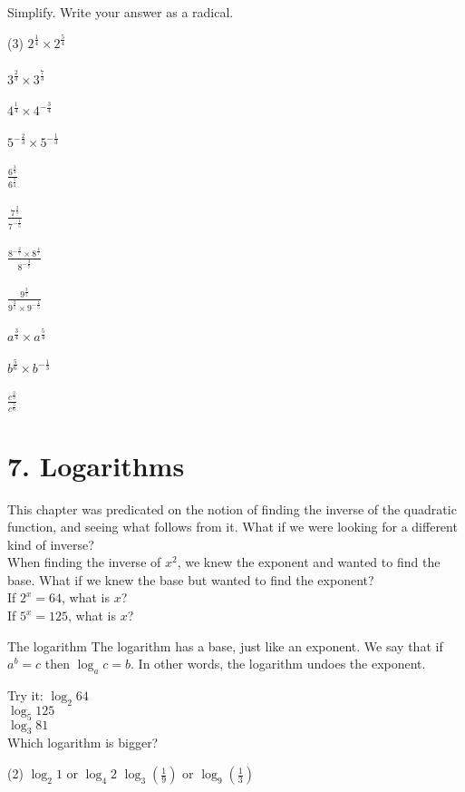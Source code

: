 \documentclass[12pt,fleqn]{book}
\newcommand{\prb}[1]{\begin{Exercise}#1\end{Exercise}}
\begin{document}
    \prb{Simplify. Write your answer as a radical.\\
        \begin{tasks}(3)
\task $\displaystyle 2^{\frac{1}{4}} \times 2^{\frac{5}{4}}$\\
\\[1in]
\task $\displaystyle 3^{\frac{2}{3}} \times 3^{\frac{7}{3}}$\\
\\[1in]
\task $\displaystyle 4^{\frac{1}{4}} \times 4^{-\frac{3}{4}}$\\
\\[1in]
\task $\displaystyle 5^{-\frac{2}{3}} \times 5^{-\frac{1}{3}}$\\
\\[1in]
\task $\displaystyle \frac{6^{\frac{3}{4}}}{6^{\frac{5}{4}}}$\\
\\[1in]
\task $\displaystyle \frac{7^{\frac{2}{5}}}{7^{-\frac{1}{5}}}$\\
\\[1in]
\task $\displaystyle \frac{8^{-\frac{2}{7}} \times 8^{\frac{4}{7}}}{8^{-\frac{3}{7}}}$\\
\\[1in]
\task $\displaystyle \frac{9^{\frac{3}{5}}}{9^{\frac{2}{5}} \times 9^{-\frac{4}{5}}}$\\
\\[1in]
\task $\displaystyle a^{\frac{3}{4}} \times a^{\frac{5}{4}}$\\
\\[1in]
\task $\displaystyle b^{\frac{5}{6}} \times b^{-\frac{1}{3}}$\\
\\[1in]
\task $\displaystyle \frac{c^{\frac{2}{3}}}{c^{\frac{5}{6}}}$
\\[1in]
\end{tasks}
}
\chapter{7. Logarithms}
This chapter was predicated on the notion of finding the inverse of the quadratic function, and seeing what follows from it.  What if we were looking for a different kind of inverse?
\\[1em]
When finding the inverse of $x^2$, we knew the exponent and wanted to find the base.  What if we knew the base but wanted to find the exponent?
\\[1em]
If $2^x=64$, what is $x$?
\\[1in]
If $5^x=125$, what is $x$?
\\[1in]
\begin{defn}{The logarithm}{}
The logarithm has a base, just like an exponent.  We say that if $a^b=c$ then $\log_a c=b$.  In other words, the logarithm undoes the exponent.
\end{defn}
Try it: $\log_2 64$
\\[1in]
$\log_5 125$
\\[1in]
$\log_3 81$
\\[1in]
Which logarithm is bigger?
\begin{tasks}(2)
    \task
$\log _2 1$ or $\log _4 2$
\task
$\log _3\left(\frac{1}{9}\right)$ or $\log _9\left(\frac{1}{3}\right)$
\end{tasks}
\end{document}
